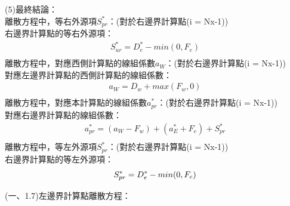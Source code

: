 \documentclass[12pt]{article}
\begin{document}
\noindent (5)最終結論：\\
離散方程中，等右外源項$S_{pr}^{*}$：(對於右邊界計算點(i = Nx-1))\\
右邊界計算點的等右外源項：\\
\begin{equation}
    \begin{split}
        S_{ur}^{*} = D_{e}^{*} -min(0,F_{e})\\
    \end{split}
\end{equation}
\noindent 離散方程中，對應西側計算點的線組係數$a_{W}$：(對於右邊界計算點(i = Nx-1))\\
對應左邊界計算點的西側計算點的線組係數：\\
\begin{equation}
    \begin{split}
        a_{W} = D_{w} + max(F_{w} , 0)\\
    \end{split}
\end{equation}
\noindent 離散方程中，對應本計算點的線組係數$a_{pr}^{*}$：(對於右邊界計算點(i = Nx-1))\\
對應右邊界計算點的線組係數：\\
\begin{equation}
    \begin{split}
        a_{pr}^{*} = (a_{W}-F_{w}) + (a_{E}^{*} + F_{e}) + S_{pr}^{*}\\
    \end{split}
\end{equation}
\noindent 離散方程中，等左外源項$S_{pr}^{*}$：(對於右邊界計算點(i = Nx-1))\\
右邊界計算點的等左外源項：\\
\begin{equation}
    S_{pr}^{*} =  D_{e}^{*} -min(0,F_{e})\\
\end{equation}
\newpage 

\noindent (一、1.7)左邊界計算點離散方程：\\
\end{document}
